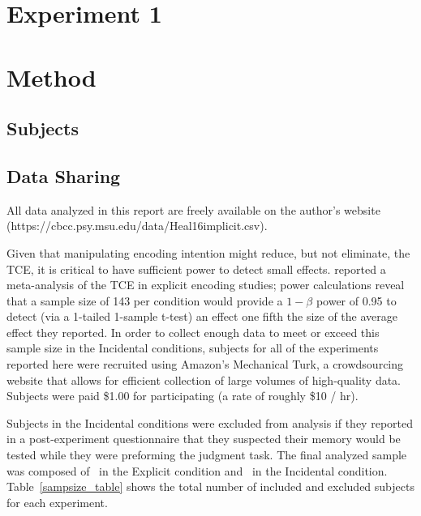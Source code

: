 \documentclass[man,natbib,floatsintext]{apa6} %
\begin{document}
\section{Experiment 1}

\section{Method}

\newcommand\listlength{16} %
\newcommand\presrate{4 seconds} %
\newcommand\isi{1 second} %
\newcommand\DFRDelay{16 seconds} %
\newcommand\recalltime{75 seconds} %
\newcommand\totalss{XX}
\newcommand\totalexcluded{XX}

\subsection{Subjects}

\subsection{Data Sharing}All data analyzed in this report are freely available on the author's website (https://cbcc.psy.msu.edu/data/Heal16implicit.csv).

Given that manipulating encoding intention might reduce, but not eliminate, the TCE, it is critical to have sufficient power to detect small effects. \citet{SedeEtal10} reported a meta-analysis of the TCE in explicit encoding studies; power calculations reveal that a sample size of 143 per condition would provide a $1-\beta$ power of 0.95 to detect (via a 1-tailed 1-sample t-test) an effect one fifth the size of the average effect they reported. 
In order to collect enough data to meet or exceed this sample size in the Incidental conditions, subjects for all of the experiments reported here were recruited using Amazon's Mechanical Turk, a crowdsourcing website that allows for efficient collection of large volumes of high-quality data. Subjects were paid \$1.00 for participating (a rate of roughly \$10 / hr).

Subjects in the Incidental conditions were excluded from analysis if they reported in a post-experiment questionnaire that they suspected their memory would be tested while they were preforming the judgment task. The final analyzed sample was composed of \shoeExplicitIncluded~in the Explicit condition and \shoeIncidentalIncluded~in the Incidental condition. Table~\ref{sampsize_table} shows the total number of included and excluded subjects for each experiment.
\end{document}
